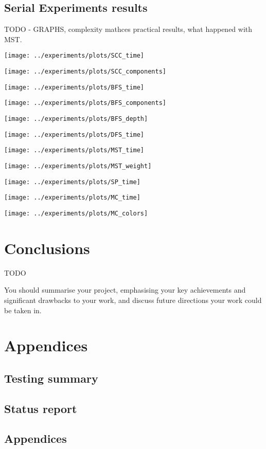 \documentclass{report}
\theoremstyle{plain}
\theoremstyle{definition}
\theoremstyle{remark}
\begin{document}
\section{Serial Experiments results}

TODO - GRAPHS, complexity mathces practical results, what happened with MST.

\texttt{[image: ../experiments/plots/SCC\_time]}

\texttt{[image: ../experiments/plots/SCC\_components]}

\texttt{[image: ../experiments/plots/BFS\_time]}

\texttt{[image: ../experiments/plots/BFS\_components]}

\texttt{[image: ../experiments/plots/BFS\_depth]}

\texttt{[image: ../experiments/plots/DFS\_time]}

\texttt{[image: ../experiments/plots/MST\_time]}

\texttt{[image: ../experiments/plots/MST\_weight]}

\texttt{[image: ../experiments/plots/SP\_time]}

\texttt{[image: ../experiments/plots/MC\_time]}

\texttt{[image: ../experiments/plots/MC\_colors]}

\chapter{Conclusions}

TODO

You should summarise your project, emphasising your key achievements
and significant drawbacks to your work, and discuss future directions your
work could be taken in.

\chapter{Appendices}

\section{Testing summary}

\section{Status report}

\section{Appendices}



\end{document}
